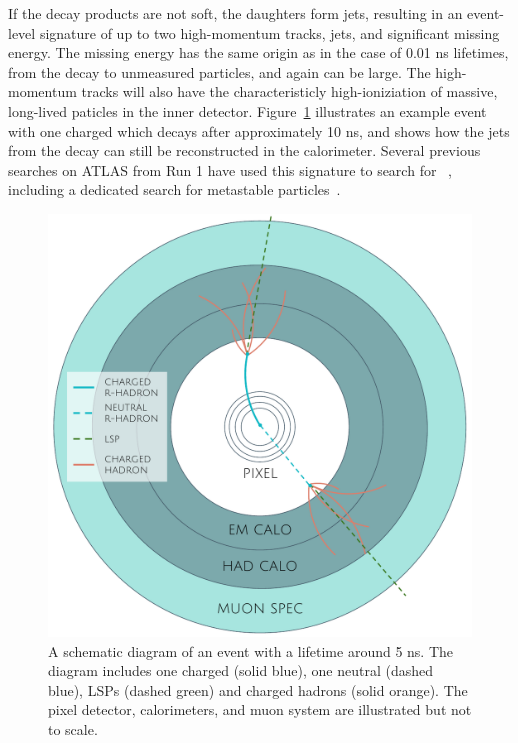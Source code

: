 If the decay products are not soft, the \rhadron daughters form jets, resulting in an event-level signature of up to two high-momentum tracks, jets, and significant missing energy.
The missing energy has the same origin as in the case of 0.01 ns lifetimes, from the decay to unmeasured particles, and again can be large.
The high-momentum tracks will also have the characteristicly high-ioniziation of massive, long-lived paticles in the inner detector.
Figure~\ref{fig:rhadron_metastable_short} illustrates an example event with one charged \rhadron which decays after approximately 10 ns, and shows how the jets from the decay can still be reconstructed in the calorimeter.
Several previous searches on ATLAS from Run 1 have used this signature to search for \rhadrons~\cite{SUSY-2012-01, SUSY-2013-22}, including a dedicated search for metastable particles~\cite{SUSY-2014-09}.

\begin{figure}[h!]
\centering
\includegraphics[width=\halffig]{figures/rhadron_metastable_short.pdf}
\caption{A schematic diagram of an \rhadron event with a lifetime around 5 ns. The diagram includes one charged \rhadron (solid blue), one neutral \rhadron (dashed blue), \acp{LSP} (dashed green) and charged hadrons (solid orange). The pixel detector, calorimeters, and muon system are illustrated but not to scale.}
\label{fig:rhadron_metastable_short}
\end{figure}


